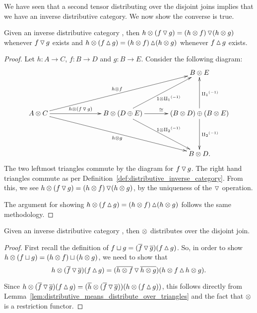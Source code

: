 We have seen that a second tensor distributing over the disjoint joins implies that we have an
inverse distributive category. We now show the converse is true.
\begin{lemma}\label{lem:distributive_means_distribute_over_triangles}
  Given an inverse distributive category \X, then $h\otimes(f\operatorname{\triangledown} g) = (h\otimes f) \operatorname{\triangledown} (h\otimes g)$
  whenever $f\operatorname{\triangledown} g$ exists and $h\otimes(f\operatorname{\vartriangle} g) = (h\otimes f) \operatorname{\vartriangle} (h\otimes g)$ whenever
  $f\operatorname{\vartriangle} g$ exists.
\end{lemma}
\begin{proof}
  Let $h:A \to C$, $f:B \to D$ and $g: B \to E$. Consider the following diagram:
  \[
    \xymatrix@R+20pt@C+10pt{
      & && B\*E\\
      A\*C \ar[rr]^{h\*(f\tjdown g)} \ar[drrr]_{h\*g} \ar[urrr]^{h\*f}
        && B \* (D \+ E) \ar[r]^{\cong} \ar[ur]_{1\*\icpa} \ar[dr]^{1\*\icpb}
        & (B\*D) \+ (B \* E) \ar[d]^{\icpb} \ar[u]_{\icpa}\\
      & && B\*D.
    }
  \]
  The two leftmost  triangles commute by the diagram for $f\operatorname{\triangledown} g$. The right hand triangles
  commute as per Definition~\ref{def:distributive_inverse_category}. From this, we see
  $h\otimes(f\operatorname{\triangledown} g) = (h\otimes f)\operatorname{\triangledown}(h\otimes g)$, by the uniqueness of the
  $\operatorname{\triangledown}$ operation.

  The argument for showing $h\otimes(f\operatorname{\vartriangle} g) = (h\otimes f)\operatorname{\vartriangle}(h\otimes g)$ follows the same methodology.
\end{proof}
\begin{lemma}\label{lem:distributive_means_distribute_over_join}
  Given an inverse distributive category \X, then $\otimes$ distributes over the disjoint join.
\end{lemma}
\begin{proof}
  First recall the definition of $f\sqcup g = (\overline{f}\operatorname{\triangledown}\overline{g})(f\operatorname{\vartriangle} g)$. So, in order
  to show $h\otimes(f\sqcup g) = (h\otimes f)\sqcup (h\otimes g)$, we need to show that
  \begin{equation}
    h\otimes(\overline{f}\operatorname{\triangledown}\overline{g})(f\operatorname{\vartriangle} g) = (\overline{h\otimes f}\operatorname{\triangledown}\overline{h\otimes g})(h\otimes f\operatorname{\vartriangle} h\otimes g).
    \label{eq:distribute_over_left_right}
  \end{equation}

  Since $h\otimes(\overline{f}\operatorname{\triangledown}\overline{g})(f\operatorname{\vartriangle} g) =
  (\overline{h}\otimes(\overline{f}\operatorname{\triangledown}\overline{g}))(h\otimes(f\operatorname{\vartriangle} g))$, this follows directly from
  Lemma~\ref{lem:distributive_means_distribute_over_triangles} and the fact that $\otimes$ is a
  restriction functor.
\end{proof}

